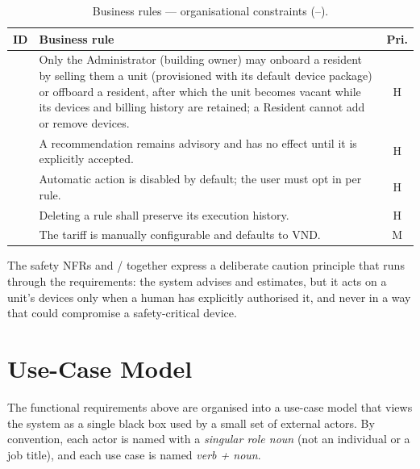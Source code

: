 \begin{table}[htbp]
\centering
\caption{Business rules --- organisational constraints (--).}
\label{tab:br}
\small
\begin{tabularx}{\linewidth}{@{}l Y c@{}}
\toprule
\textbf{ID} & \textbf{Business rule} & \textbf{Pri.}\\
\midrule
{} & Only the Administrator (building owner) may onboard a resident by selling them a unit (provisioned with its default device package) or offboard a resident, after which the unit becomes vacant while its devices and billing history are retained; a Resident cannot add or remove devices. & H\\
 & A recommendation remains advisory and has no effect until it is explicitly accepted. & H\\
 & Automatic action is disabled by default; the user must opt in per rule. & H\\
 & Deleting a rule shall preserve its execution history. & H\\
 & The tariff is manually configurable and defaults to VND. & M\\
\bottomrule
\end{tabularx}
\end{table}

The safety NFRs and / together express a deliberate caution
principle that runs through the requirements: the system advises and estimates, but it
acts on a unit's devices only when a human has explicitly authorised it, and
never in a way that could compromise a safety-critical device.

\section{Use-Case Model}
\label{sec:usecase}

The functional requirements above are organised into a use-case model that views the
system as a single black box used by a small set of external actors. By convention,
each actor is named with a \emph{singular role noun} (not an
individual or a job title), and each use case is named \emph{verb + noun}.


